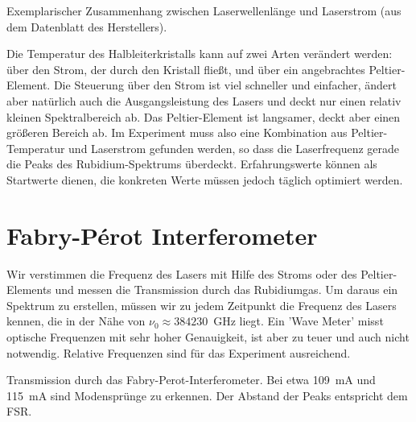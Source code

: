 \begin{marginfigure}
	\caption{Exemplarischer Zusammenhang zwischen Laserwellenlänge und Laserstrom (aus dem Datenblatt des Herstellers).}
\end{marginfigure}

Die Temperatur des Halbleiterkristalls kann auf zwei Arten verändert werden: über den Strom, der durch den Kristall fließt, und über ein angebrachtes Peltier-Element. Die Steuerung über den Strom ist viel schneller und einfacher, ändert aber natürlich auch die Ausgangsleistung des Lasers und deckt nur einen relativ kleinen Spektralbereich ab. Das Peltier-Element ist langsamer, deckt aber einen größeren Bereich ab. Im Experiment muss also eine Kombination aus Peltier-Temperatur und Laserstrom gefunden werden, so dass die Laserfrequenz gerade die Peaks des Rubidium-Spektrums überdeckt. Erfahrungswerte können als Startwerte dienen, die konkreten Werte müssen jedoch täglich optimiert werden.


\section{Fabry-Pérot Interferometer}

Wir verstimmen die Frequenz des Lasers mit Hilfe des Stroms oder des Peltier-Elements und messen die Transmission durch das Rubidiumgas. Um daraus ein Spektrum zu erstellen, müssen wir zu jedem Zeitpunkt die Frequenz des Lasers kennen, die in der Nähe von $\nu_0 \approx 384 230$~GHz liegt. Ein 'Wave Meter' misst optische Frequenzen mit sehr hoher Genauigkeit, ist aber zu teuer und auch nicht notwendig. Relative Frequenzen sind für das Experiment ausreichend.

\begin{marginfigure}
	\caption{Transmission durch das Fabry-Perot-Interferometer. Bei etwa 109~mA und 115~mA sind Modensprünge zu erkennen. Der Abstand der Peaks entspricht dem FSR.}
\end{marginfigure}

